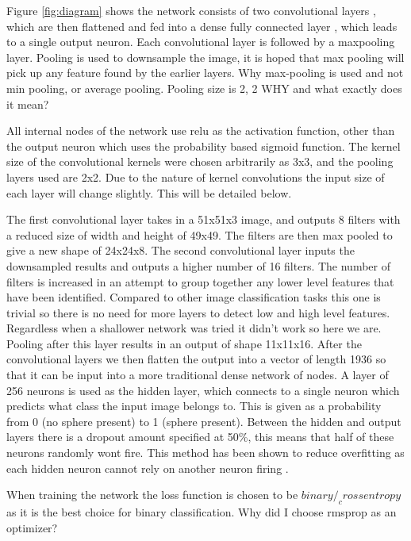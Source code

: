 \documentclass{article}
\begin{document}
Figure \ref{fig:diagram} shows the network consists of two convolutional layers
, which are then flattened and fed into  a dense fully connected layer
, which leads to a single output neuron.
Each convolutional layer is followed by a maxpooling layer.
Pooling is used to downsample the image, it is hoped that max pooling will pick up any feature found by the earlier layers.
Why max-pooling is used and not min pooling, or average pooling.
Pooling size is 2, 2 WHY and what exactly does it mean?

All internal nodes of the network use relu as the activation function, other than the output neuron which uses the probability based sigmoid function.
The kernel size of the convolutional kernels were chosen arbitrarily as 3x3, and the pooling layers used are 2x2.
Due to the nature of kernel convolutions the input size of each layer will change slightly.
This will be detailed below.

The first convolutional layer takes in a 51x51x3 image, and outputs 8 filters with a reduced size of width and height of 49x49.
The filters are then max pooled to give a new shape of 24x24x8.
The second convolutional layer inputs the downsampled results and outputs a higher number of 16 filters.
The number of filters is increased in an attempt to group together any lower level features that have been identified.
Compared to other image classification tasks this one is trivial so there is no need for more layers to detect low and high level features.
Regardless when a shallower network was tried it didn't work so here we are.  
Pooling after this layer results in an output of shape 11x11x16.
After the convolutional layers we then flatten the output into a vector of length 1936 so that it can be input into a more traditional dense network of nodes.
A layer of 256 neurons is used as the hidden layer, which connects to a single neuron which predicts what class the input image belongs to.
This is given as a probability from 0 (no sphere present) to 1 (sphere present).
Between the hidden and output layers there is a dropout amount specified at 50\%, this means that half of these neurons randomly wont fire.
This method has been shown to reduce overfitting as each hidden neuron cannot rely on another neuron firing \cite{hinton2012improving}. %

When training the network the loss function is chosen to be $binary/_crossentropy$ as it is the best choice for binary classification.
Why did I choose rmsprop as an optimizer? 
\end{document}
